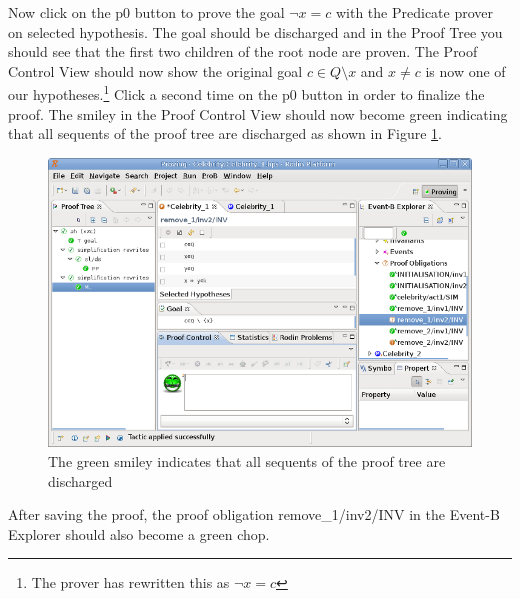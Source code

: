 Now click on the \textsf{p0} button to prove the goal $\lnot x = c$ with the \textsf{Predicate prover on selected hypothesis}. The goal should be discharged and in the Proof Tree you should see that the first two children of the root node are proven. The \textsf{Proof Control View} should now show the original goal $c \in Q \setminus {x}$ and $x\neq c$ is now one of our hypotheses.\footnote{The prover has rewritten this as $ \lnot x = c$} Click a second time on the \textsf{p0} button in order to finalize the proof. The smiley in the \textsf{Proof Control View} should now become green indicating that all sequents of the proof tree are discharged as shown in Figure \ref{fig_tut_08_proof_final}.

\begin{figure}[!ht]
\begin{center}
	\includegraphics{img/tutorial/tut_08_proof_final.png}
	\caption{The green smiley indicates that all sequents of the proof tree are discharged}
	\label{fig_tut_08_proof_final}
\end{center}
\end{figure}

After saving the proof, the proof obligation \textsf{remove\_1/inv2/INV} in the \textsf{Event-B Explorer} should also become a green chop.



